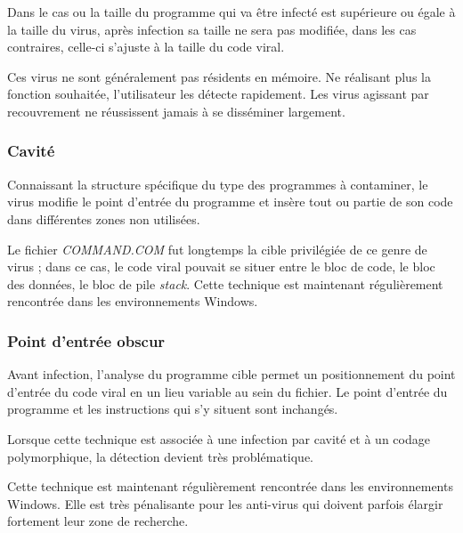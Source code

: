         Dans le cas ou la taille du programme qui va être infecté est supérieure ou égale à la taille du virus, 
        après infection sa taille ne sera pas modifiée, dans les cas contraires, 
        celle-ci s’ajuste à la taille du code viral. %

        Ces virus ne sont généralement pas résidents en mémoire. Ne réalisant plus la fonction souhaitée, 
        l’utilisateur les détecte rapidement. Les virus agissant par recouvrement ne réussissent jamais 
        à se disséminer largement. %

        \subsubsection{Cavité}
        Connaissant la structure spécifique du type des programmes à contaminer, le virus modifie le point 
        d'entrée du programme et insère tout ou partie de son code dans différentes zones non utilisées. %
        
        Le fichier \emph{COMMAND.COM} fut longtemps la cible privilégiée de ce genre de virus ; 
        dans ce cas, le code viral pouvait se situer entre le bloc de code, le bloc des données, le bloc de pile 
        \emph{stack}. Cette technique est maintenant régulièrement rencontrée dans les environnements Windows. %

        \subsubsection{Point d'entrée obscur}
        Avant infection, l'analyse du programme cible permet un positionnement du point d'entrée du code 
        viral en un lieu variable au sein du fichier. Le point d’entrée du programme et les instructions qui 
        s’y situent sont inchangés. %

        Lorsque cette technique est associée à une infection par cavité et à un codage polymorphique, 
        la détection devient très problématique. %

        Cette technique est maintenant régulièrement rencontrée dans les environnements Windows. 
        Elle est très pénalisante pour les anti-virus qui doivent parfois élargir fortement leur zone de recherche.

